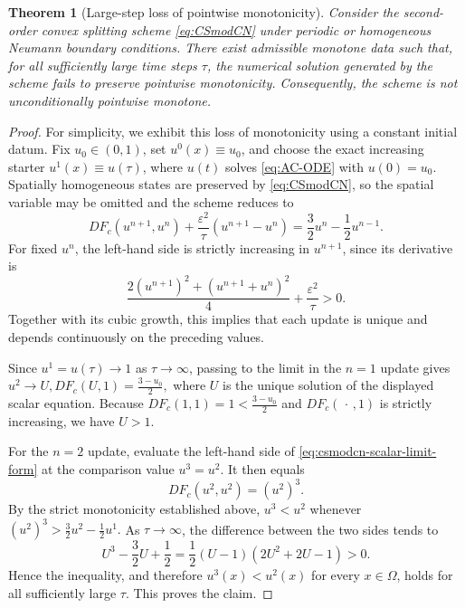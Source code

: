 \documentclass[final, 3p, times]{elsarticle}%
\newcommand{\eps}{\varepsilon}
\newtheorem{theorem}{Theorem}[section]
\begin{document}

\begin{theorem}[Large-step loss of pointwise monotonicity]
\label{thm:CSmodCN-nonmonotone}
Consider the second-order convex splitting scheme \eqref{eq:CSmodCN}
under periodic or homogeneous Neumann boundary conditions. There exist
admissible monotone data such that, for all sufficiently large time steps
\(\tau\), the numerical solution generated by the scheme fails to
preserve pointwise monotonicity. Consequently, the scheme is not
unconditionally pointwise monotone.
\end{theorem}

\begin{proof}
For simplicity, we exhibit this loss of monotonicity using a constant
initial datum. Fix \(u_0\in(0,1)\), set \(u^0(x)\equiv u_0\), and choose
the exact increasing starter \(u^1(x)\equiv u(\tau)\), where \(u(t)\)
solves \eqref{eq:AC-ODE} with \(u(0)=u_0\). Spatially homogeneous states
are preserved by \eqref{eq:CSmodCN}, so the spatial variable may be
omitted and the scheme reduces to
\begin{equation}
    D F_c(u^{n+1},u^n)
    +\frac{\eps^2}{\tau}(u^{n+1}-u^n)
    =\frac32u^n-\frac12u^{n-1}.
    \label{eq:csmodcn-scalar-limit-form}
\end{equation}
For fixed \(u^n\), the left-hand side is strictly increasing in
\(u^{n+1}\), since its derivative is
\[
    \frac{2(u^{n+1})^2+(u^{n+1}+u^n)^2}{4}
    +\frac{\eps^2}{\tau}>0.
\]
Together with its cubic growth, this implies that each update is unique
and depends continuously on the preceding values.

Since \(u^1=u(\tau)\to1\) as \(\tau\to\infty\), passing to the limit in
the \(n=1\) update gives
$
u^2\longrightarrow U,
D F_c(U,1)=\frac{3-u_0}{2},
$
where \(U\) is the unique solution of the displayed scalar equation.
Because
$
DF_c(1,1)=1<\frac{3-u_0}{2}
$
and \(D F_c(\,\cdot\,,1)\) is strictly increasing, we have \(U>1\).

For the \(n=2\) update, evaluate the left-hand side of
\eqref{eq:csmodcn-scalar-limit-form} at the comparison value
\(u^3=u^2\). It then equals
\[
    D F_c(u^2,u^2)=(u^2)^3.
\]
By the strict monotonicity established above, \(u^3<u^2\) whenever
\(
    (u^2)^3>\frac32u^2-\frac12u^1.
\)
As \(\tau\to\infty\), the difference between the two sides tends to
\[
    U^3-\frac32U+\frac12
    =\frac12(U-1)(2U^2+2U-1)>0.
\]
Hence the inequality, and therefore \(u^3(x)<u^2(x)\) for every
\(x\in\Omega\), holds for all sufficiently large \(\tau\). This proves
the claim.
\end{proof}
\end{document}
